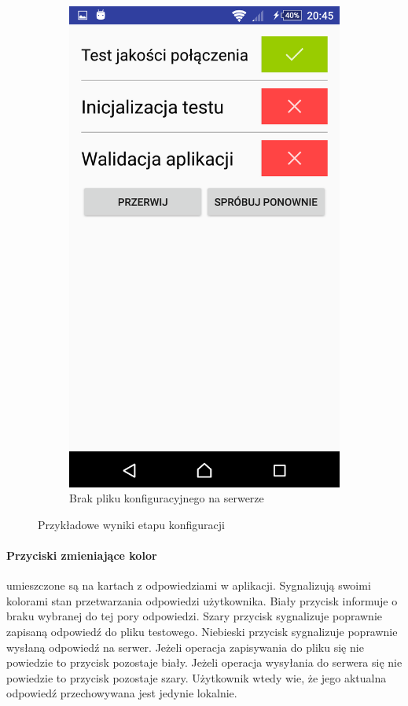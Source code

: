 \documentclass{report}
\begin{document}
\begin{figure}[ht]
\begin{subfigure}{.3\textwidth}
						\includegraphics[width=.7\linewidth]{walidacja_brak_pliku_konfiguracyjnego.png}
						\caption{Brak pliku konfiguracyjnego na serwerze}
						\label{fig:walidacja_brak_pliku}
					\end{subfigure}
					\caption{Przykładowe wyniki etapu konfiguracji}
					\label{fig:wyglad_aplikacji_3}
				\end{figure}
				
				\paragraph{Przyciski zmieniające kolor}
				umieszczone są na kartach z odpowiedziami w aplikacji. Sygnalizują swoimi kolorami stan przetwarzania odpowiedzi użytkownika. Biały przycisk informuje o braku wybranej do tej pory odpowiedzi. Szary przycisk sygnalizuje poprawnie zapisaną odpowiedź do pliku testowego. Niebieski przycisk sygnalizuje poprawnie wysłaną odpowiedź na serwer.
				Jeżeli operacja zapisywania do pliku się nie powiedzie to przycisk pozostaje biały.
				Jeżeli operacja wysyłania do serwera się nie powiedzie to przycisk pozostaje szary. Użytkownik wtedy wie, że jego aktualna odpowiedź przechowywana jest jedynie lokalnie.\\
				
\end{document}
